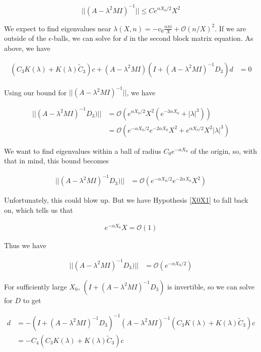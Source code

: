 \documentclass[12pt]{article}
\begin{document}
\begin{enumerate}
\[
||(A - \lambda^2 M I)^{-1}|| \leq C e^{\alpha X_0/2} X^2
\]


We expect to find eigenvalues near $\lambda(X, n) = -c_0 \frac{n \pi i }{X} + \mathcal{O}(n/X)^2$. If we are outside of the $\epsilon$-balls, we can solve for $d$ in the second block matrix equation. As above, we have

\begin{align*}
(C_3 K(\lambda) + K(\lambda) \tilde{C}_3) c + (A - \lambda^2 MI)(I + (A - \lambda^2 MI)^{-1} D_3)d &= 0
\end{align*}

Using our bound for $||(A - \lambda^2 M I)^{-1}||$, we have

\begin{align*}
||(A - \lambda^2 MI)^{-1} D_3)|| &= \mathcal{O}(e^{\alpha X_0/2} X^2(e^{-3 \alpha X_0} + |\lambda|^3)) \\
&= \mathcal{O}(e^{-\alpha X_0/2} e^{-2 \alpha X_0} X^2 + e^{\alpha X_0/2} X^2 |\lambda|^3)
\end{align*}

We want to find eigenvalues within a ball of radius $C_0 e^{-\alpha X_0}$ of the origin, so, with that in mind, this bound becomes

\begin{align*}
||(A - \lambda^2 MI)^{-1} D_3)|| 
&= \mathcal{O}(e^{-\alpha X_0/2} e^{-2 \alpha X_0} X^2 )
\end{align*}

Unfortunately, this could blow up. But we have Hypothesis \ref{X0X1} to fall back on, which tells us that

\begin{align*}
e^{-\alpha X_0} X = \mathcal{O}(1)
\end{align*}

Thus we have

\begin{align*}
||(A - \lambda^2 MI)^{-1} D_3)|| 
&= \mathcal{O}(e^{-\alpha X_0/2})
\end{align*}

For sufficiently large $X_0$, $(I + (A - \lambda^2 MI)^{-1} D_3)$ is invertible, so we can solve for $D$ to get

\begin{align*}
 d &= 
 -(I + (A - \lambda^2 MI)^{-1} D_3)^{-1}(A - \lambda^2 MI)^{-1}(C_3 K(\lambda) + K(\lambda) \tilde{C}_3) c \\
 &= -C_4 (C_3 K(\lambda) + K(\lambda) \tilde{C}_3) c
\end{align*}


\end{enumerate}
\end{document}
